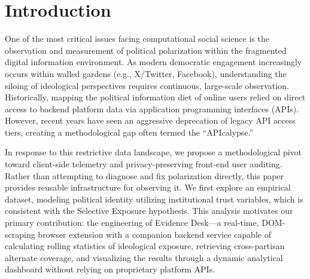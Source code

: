 \documentclass[10pt, conference, compsoc]{IEEEtran}
\begin{document}

\section{Introduction}
One of the most critical issues facing computational social science is the observation and measurement of political polarization within the fragmented digital information environment. As modern democratic engagement increasingly occurs within walled gardens (e.g., X/Twitter, Facebook), understanding the siloing of ideological perspectives requires continuous, large-scale observation. Historically, mapping the political information diet of online users relied on direct access to backend platform data via application programming interfaces (APIs). However, recent years have seen an aggressive deprecation of legacy API access tiers, creating a methodological gap often termed the ``APIcalypse.''

In response to this restrictive data landscape, we propose a methodological pivot toward client-side telemetry and privacy-preserving front-end user auditing. Rather than attempting to diagnose and fix polarization directly, this paper provides reusable infrastructure for observing it. We first explore an empirical dataset, modeling political identity utilizing institutional trust variables, which is consistent with the Selective Exposure hypothesis. This analysis motivates our primary contribution: the engineering of Evidence Desk—a real-time, DOM-scraping browser extension with a companion backend service capable of calculating rolling statistics of ideological exposure, retrieving cross-partisan alternate coverage, and visualizing the results through a dynamic analytical dashboard without relying on proprietary platform APIs.
\end{document}
